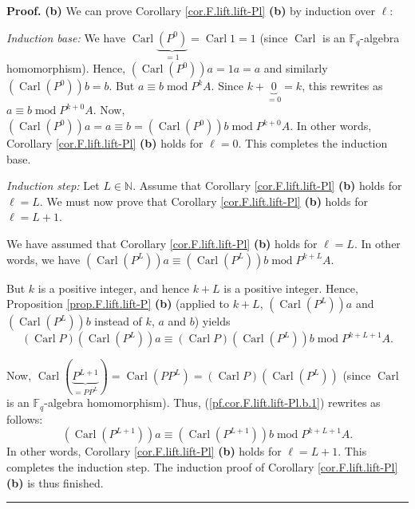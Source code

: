 \documentclass[numbers=enddot,12pt,final,onecolumn,notitlepage]{scrartcl}%
\theoremstyle{definition}
\newenvironment{proof}[1][Proof]{\noindent\textbf{#1.} }{\ \rule{0.5em}{0.5em}}
\begin{document}
\begin{proof}
\textbf{(b)} We can prove Corollary \ref{cor.F.lift.lift-Pl} \textbf{(b)} by
induction over $\ell$:

\textit{Induction base:} We have $\operatorname*{Carl}\underbrace{\left(
P^{0}\right)  }_{=1}=\operatorname*{Carl}1=1$ (since $\operatorname*{Carl}$ is
an $\mathbb{F}_{q}$-algebra homomorphism). Hence, $\left(
\operatorname*{Carl}\left(  P^{0}\right)  \right)  a=1a=a$ and similarly
$\left(  \operatorname*{Carl}\left(  P^{0}\right)  \right)  b=b$. But $a\equiv
b\operatorname{mod}P^{k}A$. Since $k+\underbrace{0}_{=0}=k$, this rewrites as
$a\equiv b\operatorname{mod}P^{k+0}A$. Now, $\left(  \operatorname*{Carl}%
\left(  P^{0}\right)  \right)  a=a\equiv b=\left(  \operatorname*{Carl}\left(
P^{0}\right)  \right)  b\operatorname{mod}P^{k+0}A$. In other words, Corollary
\ref{cor.F.lift.lift-Pl} \textbf{(b)} holds for $\ell=0$. This completes the
induction base.

\textit{Induction step:} Let $L\in\mathbb{N}$. Assume that Corollary
\ref{cor.F.lift.lift-Pl} \textbf{(b)} holds for $\ell=L$. We must now prove
that Corollary \ref{cor.F.lift.lift-Pl} \textbf{(b)} holds for $\ell=L+1$.

We have assumed that Corollary \ref{cor.F.lift.lift-Pl} \textbf{(b)} holds for
$\ell=L$. In other words, we have $\left(  \operatorname*{Carl}\left(
P^{L}\right)  \right)  a\equiv\left(  \operatorname*{Carl}\left(
P^{L}\right)  \right)  b\operatorname{mod}P^{k+L}A$.

But $k$ is a positive integer, and hence $k+L$ is a positive integer. Hence,
Proposition \ref{prop.F.lift.lift-P} \textbf{(b)} (applied to $k+L$, $\left(
\operatorname*{Carl}\left(  P^{L}\right)  \right)  a$ and $\left(
\operatorname*{Carl}\left(  P^{L}\right)  \right)  b$ instead of $k$, $a$ and
$b$) yields
\begin{equation}
\left(  \operatorname*{Carl}P\right)  \left(  \operatorname*{Carl}\left(
P^{L}\right)  \right)  a\equiv\left(  \operatorname*{Carl}P\right)  \left(
\operatorname*{Carl}\left(  P^{L}\right)  \right)  b\operatorname{mod}%
P^{k+L+1}A. \label{pf.cor.F.lift.lift-Pl.b.1}%
\end{equation}

Now, $\operatorname*{Carl}\left(  \underbrace{P^{L+1}}_{=PP^{L}}\right)
=\operatorname*{Carl}\left(  PP^{L}\right)  =\left(  \operatorname*{Carl}%
P\right)  \left(  \operatorname*{Carl}\left(  P^{L}\right)  \right)  $ (since
$\operatorname*{Carl}$ is an $\mathbb{F}_{q}$-algebra homomorphism). Thus,
(\ref{pf.cor.F.lift.lift-Pl.b.1}) rewrites as follows:%
\[
\left(  \operatorname*{Carl}\left(  P^{L+1}\right)  \right)  a\equiv\left(
\operatorname*{Carl}\left(  P^{L+1}\right)  \right)  b\operatorname{mod}%
P^{k+L+1}A.
\]
In other words, Corollary \ref{cor.F.lift.lift-Pl} \textbf{(b)} holds for
$\ell=L+1$. This completes the induction step. The induction proof of
Corollary \ref{cor.F.lift.lift-Pl} \textbf{(b)} is thus finished.
\end{proof}
\end{document}
